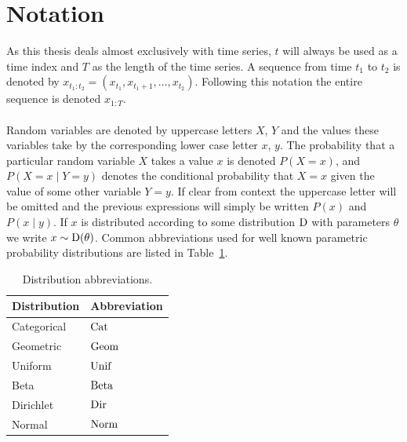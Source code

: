 \documentclass[12pt]{report}
\newcommand{\1}[0]{\mathbbm{1}}
\newcommand{\Beta}[0]{\textnormal{Beta}}
\newcommand{\Unif}[0]{\textnormal{Unif}}
\newcommand{\Cat}[0]{\textnormal{Cat}}
\newcommand{\Dir}[0]{\textnormal{Dir}}
\newcommand{\Norm}[0]{\textnormal{Norm}}
\newcommand{\SomeDist}[0]{\textnormal{D}}
\newcommand{\Geom}[0]{\textnormal{Geom}}
\newcommand{\seq}[3]{\ensuremath{#1_{{#2}:{#3}}}}
\begin{document}
\cleardoublepage
{}
\chapter*{Notation}
As this thesis deals almost exclusively with time series, $t$ will always
be used as a time index and $T$ as the length of the time series.
A sequence from time $t_1$ to $t_2$ is denoted by
$\seq{x}{t_1}{t_2} = (x_{t_1}, x_{t_1 + 1}, \ldots, x_{t_2})$.
Following this notation the entire sequence is denoted $\seq{x}{1}{T}$.
\\\\
Random variables are denoted by uppercase letters $X$, $Y$
and the values these variables take by the corresponding lower case
letter $x$, $y$. The probability that a particular random variable $X$
takes a value $x$ is denoted $P(X=x)$, and $P(X=x \mid Y=y)$ denotes
the conditional probability that $X=x$ given the value of some other variable $Y=y$.
If clear from context the uppercase letter will be omitted and the previous expressions
will simply be written $P(x)$ and $P(x \mid y)$. If $x$ is distributed according to some
distribution $\SomeDist$ with parameters $\theta$ we write $x \sim \SomeDist(\theta)$.
Common abbreviations used for well known parametric probability distributions are listed
in Table~\ref{table:distributions}.
\begin{table}[ht]
    \centering
    \begin{tabular}{l l}\hline
    \textbf{Distribution} & \textbf{Abbreviation}\\\hline
    Categorical & $\Cat$ \\
    Geometric & $\Geom$ \\
    Uniform & $\Unif$ \\
    Beta & $\Beta$ \\
    Dirichlet & $\Dir$ \\
    Normal & $\Norm$ \\
    \end{tabular}
    \caption[Distributions]{Distribution abbreviations.}
    \label{table:distributions}
\end{table}
\end{document}
